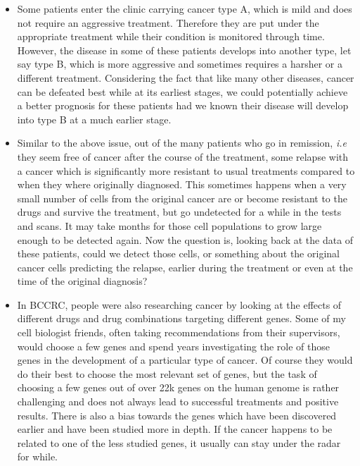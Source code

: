\begin{itemize}
  \item Some patients enter the clinic carrying cancer type A, which is mild
    and does not require an aggressive treatment. Therefore they are put under
    the appropriate treatment while their condition is monitored through time.
    However, the disease in some of these patients develops into another type,
    let say type B, which is more aggressive and sometimes requires a harsher
    or a different treatment. Considering the fact that like many other
    diseases, cancer can be defeated best while at its earliest stages, we
    could potentially achieve a better prognosis for these patients had we
    known their disease will develop into type B at a much earlier stage.

  \item Similar to the above issue, out of the many patients who go in
    remission, \emph{i.e} they seem free of cancer after the course of the
    treatment, some relapse with a cancer which is significantly more resistant
    to usual treatments compared to when they where originally diagnosed. This
    sometimes happens when a very small number of cells from the original
    cancer are or become resistant to the drugs and survive the treatment, but
    go undetected for a while in the tests and scans. It may take months for
    those cell populations to grow large enough to be detected again. Now the
    question is, looking back at the data of these patients, could we detect
    those cells, or something about the original cancer cells predicting the
    relapse, earlier during the treatment or even at the time of the original
    diagnosis?

  \item In BCCRC, people were also researching cancer by looking at the effects
    of different drugs and drug combinations targeting different genes. Some of
    my cell biologist friends, often taking recommendations from their
    supervisors, would choose a few genes and spend years investigating the
    role of those genes in the development of a particular type of cancer. Of
    course they would do their best to choose the most relevant set of genes,
    but the task of choosing a few genes out of over 22k genes on the human
    genome is rather challenging and does not always lead to successful
    treatments and positive results. There is also a bias towards the genes
    which have been discovered earlier and have been studied more in depth. If
    the cancer happens to be related to one of the less studied genes, it
    usually can stay under the radar for while.
\end{itemize}

